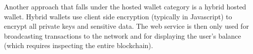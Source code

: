 Another approach that falls under the hosted wallet category is a hybrid hosted wallet. Hybrid wallets use client side encryption (typically in Javascript) to encrypt all private keys and sensitive data. The web service is then only used for broadcasting transactions to the network and for displaying the user's balance (which requires inspecting the entire blockchain).




